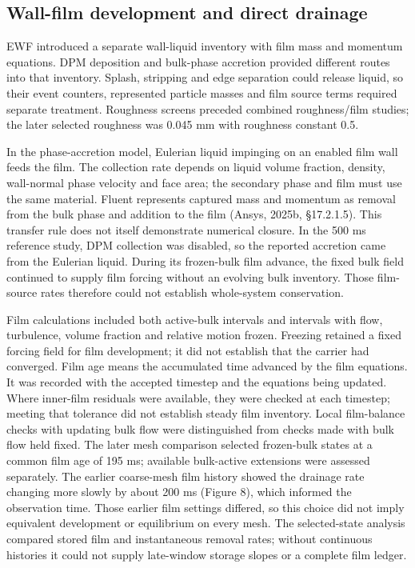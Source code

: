 \subsection{Wall-film development and direct drainage}

EWF introduced a separate wall-liquid inventory with film mass and momentum equations. DPM deposition and bulk-phase accretion provided different routes into that inventory. Splash, stripping and edge separation could release liquid, so their event counters, represented particle masses and film source terms required separate treatment. Roughness screens preceded combined roughness/film studies; the later selected roughness was 0.045 mm with roughness constant 0.5.

In the phase-accretion model, Eulerian liquid impinging on an enabled film wall feeds the film. The collection rate depends on liquid volume fraction, density, wall-normal phase velocity and face area; the secondary phase and film must use the same material. Fluent represents captured mass and momentum as removal from the bulk phase and addition to the film (Ansys, 2025b, §17.2.1.5). This transfer rule does not itself demonstrate numerical closure. In the 500 ms reference study, DPM collection was disabled, so the reported accretion came from the Eulerian liquid. During its frozen-bulk film advance, the fixed bulk field continued to supply film forcing without an evolving bulk inventory. Those film-source rates therefore could not establish whole-system conservation.

Film calculations included both active-bulk intervals and intervals with flow, turbulence, volume fraction and relative motion frozen. Freezing retained a fixed forcing field for film development; it did not establish that the carrier had converged. Film age means the accumulated time advanced by the film equations. It was recorded with the accepted timestep and the equations being updated. Where inner-film residuals were available, they were checked at each timestep; meeting that tolerance did not establish steady film inventory. Local film-balance checks with updating bulk flow were distinguished from checks made with bulk flow held fixed. The later mesh comparison selected frozen-bulk states at a common film age of 195 ms; available bulk-active extensions were assessed separately. The earlier coarse-mesh film history showed the drainage rate changing more slowly by about 200 ms (Figure 8), which informed the observation time. Those earlier film settings differed, so this choice did not imply equivalent development or equilibrium on every mesh. The selected-state analysis compared stored film and instantaneous removal rates; without continuous histories it could not supply late-window storage slopes or a complete film ledger.

